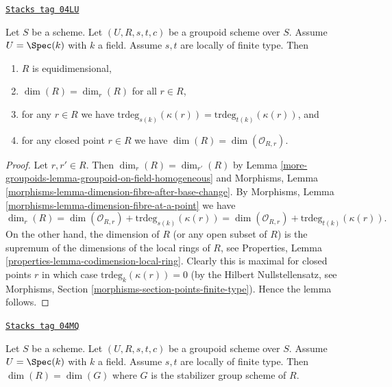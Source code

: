 \begin{lemma}
\label{more-groupoids-lemma-groupoid-on-field-locally-finite-type-dimension}
\href{https://stacks.math.columbia.edu/tag/04LU}{\texttt{Stacks tag 04LU}}

Let $S$ be a scheme. Let $(U, R, s, t, c)$ be a groupoid scheme
over $S$. Assume $U = \Spec(k)$ with $k$ a field.
Assume $s, t$ are locally of finite type.
Then
\begin{enumerate}
\item $R$ is equidimensional,
\item $\dim(R) = \dim_r(R)$ for all $r \in R$,
\item for any $r \in R$ we have
$\text{trdeg}_{s(k)}(\kappa(r)) = \text{trdeg}_{t(k)}(\kappa(r))$, and
\item for any closed point $r \in R$ we have
$\dim(R) = \dim(\mathcal{O}_{R, r})$.
\end{enumerate}
\end{lemma}

\begin{proof}
Let $r, r' \in R$.
Then $\dim_r(R) = \dim_{r'}(R)$ by
Lemma \ref{more-groupoids-lemma-groupoid-on-field-homogeneous}
and
Morphisms, Lemma \ref{morphisms-lemma-dimension-fibre-after-base-change}.
By
Morphisms, Lemma \ref{morphisms-lemma-dimension-fibre-at-a-point}
we have
$$
\dim_r(R) =
\dim(\mathcal{O}_{R, r}) + \text{trdeg}_{s(k)}(\kappa(r)) =
\dim(\mathcal{O}_{R, r}) + \text{trdeg}_{t(k)}(\kappa(r)).
$$
On the other hand, the dimension of $R$ (or any open subset of $R$)
is the supremum of the dimensions of the local rings of $R$, see
Properties, Lemma \ref{properties-lemma-codimension-local-ring}.
Clearly this is maximal for closed points $r$ in which case
$\text{trdeg}_k(\kappa(r)) = 0$ (by the Hilbert Nullstellensatz, see
Morphisms, Section \ref{morphisms-section-points-finite-type}).
Hence the lemma follows.
\end{proof}

\begin{lemma}
\label{more-groupoids-lemma-groupoid-on-field-dimension-equal-stabilizer}
\href{https://stacks.math.columbia.edu/tag/04MQ}{\texttt{Stacks tag 04MQ}}

Let $S$ be a scheme. Let $(U, R, s, t, c)$ be a groupoid scheme
over $S$. Assume $U = \Spec(k)$ with $k$ a field.
Assume $s, t$ are locally of finite type.
Then $\dim(R) = \dim(G)$ where $G$ is the stabilizer group scheme of $R$.
\end{lemma}

